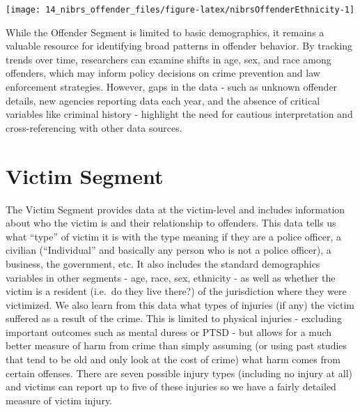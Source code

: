\documentclass[
]{krantz}
\let\origfigure\figure
\let\endorigfigure\endfigure
\renewenvironment{figure}[1][2] {
    \expandafter\origfigure\expandafter[H]
} {
    \endorigfigure
}
\begin{document}
\begin{figure}

{\centering \texttt{[image: 14\_nibrs\_offender\_files/figure-latex/nibrsOffenderEthnicity-1]} 

}

\caption{The share of offenders by ethnicity, 1991-2022.}\label{fig:nibrsOffenderEthnicity}
\end{figure}

While the Offender Segment is limited to basic demographics,
it remains a valuable resource for identifying broad
patterns in offender behavior. By tracking trends over time,
researchers can examine shifts in age, sex, and race among
offenders, which may inform policy decisions on crime
prevention and law enforcement strategies. However, gaps in
the data - such as unknown offender details, new agencies
reporting data each year, and the absence of critical
variables like criminal history - highlight the need for
cautious interpretation and cross-referencing with other
data sources.

\chapter{Victim Segment}\label{victim-segment-1}

The Victim Segment provides data at the victim-level and
includes information about who the victim is and their
relationship to offenders. This data tells us what ``type''
of victim it is with the type meaning if they are a police
officer, a civilian (``Individual'' and basically any person
who is not a police officer), a business, the government,
etc. It also includes the standard demographics variables in
other segments - age, race, sex, ethnicity - as well as
whether the victim is a resident (i.e.~do they live there?)
of the jurisdiction where they were victimized. We also
learn from this data what types of injuries (if any) the
victim suffered as a result of the crime. This is limited to
physical injuries - excluding important outcomes such as
mental duress or PTSD - but allows for a much better measure
of harm from crime than simply assuming (or using past
studies that tend to be old and only look at the cost of
crime) what harm comes from certain offenses. There are
seven possible injury types (including no injury at all) and
victims can report up to five of these injuries so we have a
fairly detailed measure of victim injury.
\end{document}
